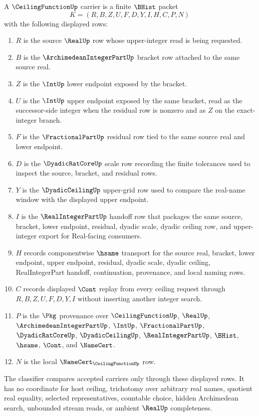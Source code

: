 \begin{definition}
\label{def:ceiling-function-carrier}
A $\CeilingFunctionUp$ carrier is a finite $\BHist$ packet
$$
K=(R,B,Z,U,F,D,Y,I,H,C,P,N)
$$
with the following displayed rows:
\begin{enumerate}
\item $R$ is the source $\RealUp$ row whose upper-integer read is being requested.
\item $B$ is the $\ArchimedeanIntegerPartUp$ bracket row attached to the same source real.
\item $Z$ is the $\IntUp$ lower endpoint exposed by the bracket.
\item $U$ is the $\IntUp$ upper endpoint exposed by the same bracket, read as the successor-side integer when the residual row is nonzero and as $Z$ on the exact-integer branch.
\item $F$ is the $\FractionalPartUp$ residual row tied to the same source real and lower endpoint.
\item $D$ is the $\DyadicRatCoreUp$ scale row recording the finite tolerances used to inspect the source, bracket, and residual rows.
\item $Y$ is the $\DyadicCeilingUp$ upper-grid row used to compare the real-name window with the displayed upper endpoint.
\item $I$ is the $\RealIntegerPartUp$ handoff row that packages the same source, bracket, lower endpoint, residual, dyadic scale, dyadic ceiling row, and upper-integer export for Real-facing consumers.
\item $H$ records componentwise $\hsame$ transport for the source real, bracket, lower endpoint, upper endpoint, residual, dyadic scale, dyadic ceiling, RealIntegerPart handoff, continuation, provenance, and local naming rows.
\item $C$ records displayed $\Cont$ replay from every ceiling request through $R,B,Z,U,F,D,Y,I$ without inserting another integer search.
\item $P$ is the $\Pkg$ provenance over $\CeilingFunctionUp$, $\RealUp$, $\ArchimedeanIntegerPartUp$, $\IntUp$, $\FractionalPartUp$, $\DyadicRatCoreUp$, $\DyadicCeilingUp$, $\RealIntegerPartUp$, $\BHist$, $\hsame$, $\Cont$, and $\NameCert$.
\item $N$ is the local $\NameCert_{\CeilingFunctionUp}$ row.
\end{enumerate}
The classifier compares accepted carriers only through these displayed rows. It has no coordinate for host ceiling, trichotomy over arbitrary real names, quotient real equality, selected representatives, countable choice, hidden Archimedean search, unbounded stream reads, or ambient $\RealUp$ completeness.
\end{definition}

